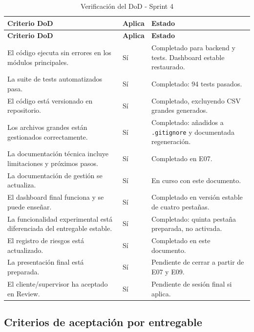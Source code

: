 \documentclass[11pt,a4paper]{article}
\begin{document}
\begin{longtable}{p{}p{}p{}}
\caption{Verificación del DoD - Sprint 4}\\
\toprule
\textbf{Criterio DoD} & \textbf{Aplica} & \textbf{Estado} \\
\midrule
\endfirsthead
\toprule
\textbf{Criterio DoD} & \textbf{Aplica} & \textbf{Estado} \\
\midrule
\endhead
El código ejecuta sin errores en los módulos principales. & Sí & Completado para backend y tests. Dashboard estable restaurado. \\
La suite de tests automatizados pasa. & Sí & Completado: 94 tests pasados. \\
El código está versionado en repositorio. & Sí & Completado, excluyendo CSV grandes generados. \\
Los archivos grandes están gestionados correctamente. & Sí & Completado: añadidos a \texttt{.gitignore} y documentada regeneración. \\
La documentación técnica incluye limitaciones y próximos pasos. & Sí & Completado en E07. \\
La documentación de gestión se actualiza. & Sí & En curso con este documento. \\
El dashboard final funciona y se puede enseñar. & Sí & Completado en versión estable de cuatro pestañas. \\
La funcionalidad experimental está diferenciada del entregable estable. & Sí & Completado: quinta pestaña preparada, no activada. \\
El registro de riesgos está actualizado. & Sí & Completado en este documento. \\
La presentación final está preparada. & Sí & Pendiente de cerrar a partir de E07 y E09. \\
El cliente/supervisor ha aceptado en Review. & Sí & Pendiente de sesión final si aplica. \\
\bottomrule
\end{longtable}

\subsection{Criterios de aceptación por entregable}
\end{document}
